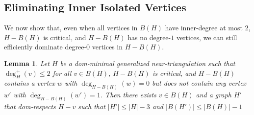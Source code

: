 \documentclass{article}
\newcommand{\pat}[1]{\textcolor{red}{PM: #1}}
\newcommand{\hussein}[1]{\textcolor{purple}{HH: #1}}
\newtheorem{lem}{Lemma}
\theoremstyle{definition}
\begin{document}
\subsection{Eliminating Inner Isolated Vertices}
\label{zero_kill_sec}

We now show that, even when all vertices in $B(H)$ have inner-degree at most $2$, $H-B(H)$ is critical, and $H-B(H)$ has no degree-$1$ vertices, we can still efficiently dominate degree-$0$ vertices in $H-B(H)$.

\begin{lem}\label{degree_zero_killer}
  Let $H$ be a dom-minimal generalized near-triangulation such that $\deg^+_H(v)\le 2$ for all $v\in B(H)$, $H-B(H)$ is critical, and $H-B(H)$ contains a vertex $w$ with $\deg_{H-B(H)}(w)=0$ but does not contain any vertex $w'$ with $\deg_{H-B(H)}(w')=1$.  Then
    there exists $v\in B(H)$ and a graph $H'$ that dom-respects $H-v$ such that $|H'|\le |H|-3$ and $|B(H')|\le |B(H)|-1$
\end{lem}

%
%
\end{document}

